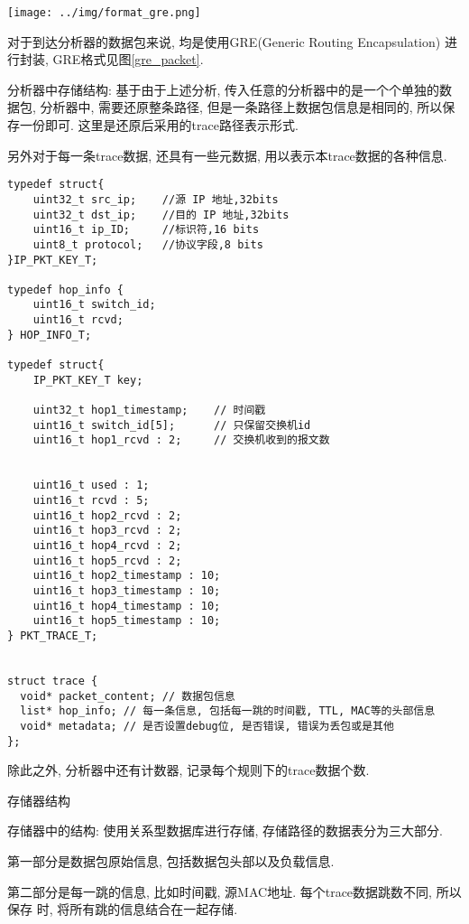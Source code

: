 {\begin{mdframed}[everyline=true]
\begin{center}
\texttt{[image: ../img/format\_gre.png]}
\label{gre_packet}
\end{center}

对于到达分析器的数据包来说, 均是使用GRE(Generic Routing Encapsulation)
进行封装, GRE格式见图\ref{gre_packet}.

分析器中存储结构: 基于由于上述分析,
传入任意的分析器中的是一个个单独的数据包, 分析器中, 需要还原整条路径,
但是一条路径上数据包信息是相同的, 所以保存一份即可.
这里是还原后采用的trace路径表示形式.

另外对于每一条trace数据, 还具有一些元数据,
用以表示本trace数据的各种信息.

\begin{lstlisting}
typedef struct{
    uint32_t src_ip;    //源 IP 地址,32bits
    uint32_t dst_ip;    //目的 IP 地址,32bits
    uint16_t ip_ID;     //标识符,16 bits
    uint8_t protocol;   //协议字段,8 bits
}IP_PKT_KEY_T;

typedef hop_info {
    uint16_t switch_id;
    uint16_t rcvd;
} HOP_INFO_T;

typedef struct{
    IP_PKT_KEY_T key;

    uint32_t hop1_timestamp;    // 时间戳
    uint16_t switch_id[5];      // 只保留交换机id
    uint16_t hop1_rcvd : 2;     // 交换机收到的报文数


    uint16_t used : 1;
    uint16_t rcvd : 5;
    uint16_t hop2_rcvd : 2;
    uint16_t hop3_rcvd : 2;
    uint16_t hop4_rcvd : 2;
    uint16_t hop5_rcvd : 2;
    uint16_t hop2_timestamp : 10;
    uint16_t hop3_timestamp : 10;
    uint16_t hop4_timestamp : 10;
    uint16_t hop5_timestamp : 10;
} PKT_TRACE_T;


struct trace {
  void* packet_content; // 数据包信息
  list* hop_info; // 每一条信息, 包括每一跳的时间戳, TTL, MAC等的头部信息
  void* metadata; // 是否设置debug位, 是否错误, 错误为丢包或是其他
};
\end{lstlisting}

除此之外, 分析器中还有计数器, 记录每个规则下的trace数据个数.

存储器结构

存储器中的结构: 使用关系型数据库进行存储, 存储路径的数据表分为三大部分.

第一部分是数据包原始信息, 包括数据包头部以及负载信息.

第二部分是每一跳的信息, 比如时间戳, 源MAC地址. 每个trace数据跳数不同,
所以保存 时, 将所有跳的信息结合在一起存储.


\end{mdframed}}
